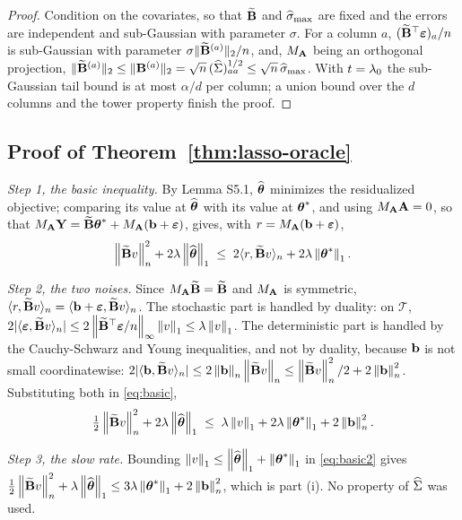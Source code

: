 \begin{proof}
Condition on the covariates, so that $\Btil$ and $\smax$ are fixed and the
errors are independent and sub-Gaussian with parameter $\sigma$. For a column
$a$, $(\Btil\T\bveps)_a/n$ is sub-Gaussian with parameter
$\sigma\lVert\Btil^{(a)}\rVert_2/n$, and, $\MA$ being an orthogonal
projection, $\lVert\Btil^{(a)}\rVert_2 \le \lVert\Bmat^{(a)}\rVert_2 =
\sqrt{n}\,(\Gramhat)_{aa}^{1/2} \le \sqrt{n}\,\smax$. With
$t = \pen_0$ the sub-Gaussian tail bound is at most $\alpha/d$ per column; a
union bound over the $d$ columns and the tower property finish the proof.
\end{proof}

\subsection*{Proof of Theorem~\ref{thm:lasso-oracle}}

\emph{Step 1, the basic inequality.} By Lemma S5.1, $\thetahat$ minimizes the
residualized objective; comparing its value at $\thetahat$ with its value at
$\thetastar$, and using $\MA\Amat = 0$, so that
$\MA\bY = \Btil\thetastar + \MA(\bb+\bveps)$, gives, with
$r = \MA(\bb+\bveps)$,
\begin{equation}
  \label{eq:basic}
  \normn{\Btil v}^2 + 2\pen\norm{\thetahat}_1
  \;\le\; 2\inner{r}{\Btil v}_n + 2\pen\norm{\thetastar}_1 .
\end{equation}

\emph{Step 2, the two noises.} Since $\MA\Btil = \Btil$ and $\MA$ is
symmetric, $\inner{r}{\Btil v}_n = \inner{\bb+\bveps}{\Btil v}_n$. The
stochastic part is handled by duality: on $\mathcal{T}$,
$2|\inner{\bveps}{\Btil v}_n| \le
2\norm{\Btil\T\bveps/n}_{\infty}\norm{v}_1 \le \pen\norm{v}_1$. The
deterministic part is handled by the Cauchy-Schwarz and Young inequalities,
and not by duality, because $\bb$ is not small coordinatewise:
$2|\inner{\bb}{\Btil v}_n| \le 2\normn{\bb}\normn{\Btil v} \le
\normn{\Btil v}^2/2 + 2\normn{\bb}^2$. Substituting both in
\eqref{eq:basic},
\begin{equation}
  \label{eq:basic2}
  \tfrac12\normn{\Btil v}^2 + 2\pen\norm{\thetahat}_1
  \;\le\; \pen\norm{v}_1 + 2\pen\norm{\thetastar}_1 + 2\normn{\bb}^2 .
\end{equation}

\emph{Step 3, the slow rate.} Bounding
$\norm{v}_1 \le \norm{\thetahat}_1+\norm{\thetastar}_1$ in
\eqref{eq:basic2} gives
$\tfrac12\normn{\Btil v}^2 + \pen\norm{\thetahat}_1 \le
3\pen\norm{\thetastar}_1 + 2\normn{\bb}^2$, which is part (i). No property of
$\Gramhat$ was used.

